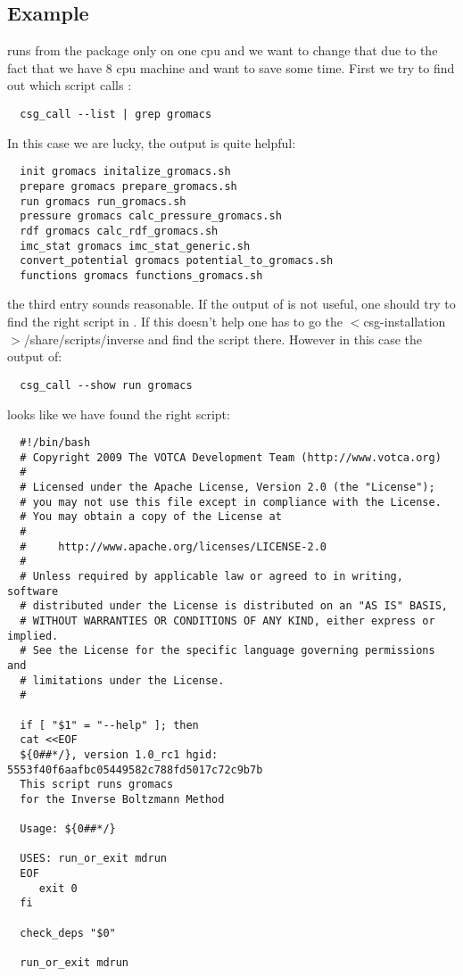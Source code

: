 \subsection*{Example}
 runs  from the \gromacs package only on one cpu and we want to change that due to the fact that we have 8 cpu machine and want to save some time.
First we try to find out which script calls :
\begin{verbatim}
  csg_call --list | grep gromacs
\end{verbatim}
In this case we are lucky, the output is quite helpful:
\begin{verbatim}
  init gromacs initalize_gromacs.sh
  prepare gromacs prepare_gromacs.sh
  run gromacs run_gromacs.sh
  pressure gromacs calc_pressure_gromacs.sh
  rdf gromacs calc_rdf_gromacs.sh
  imc_stat gromacs imc_stat_generic.sh
  convert_potential gromacs potential_to_gromacs.sh
  functions gromacs functions_gromacs.sh
\end{verbatim}
the third entry sounds reasonable. If the output of  is not useful, one should try to find the right script in . If this doesn't help one has to go the $<$csg-installation$>$/share/scripts/inverse and find the script there. However in this case the output of:
\begin{verbatim}
  csg_call --show run gromacs
\end{verbatim}
looks like we have found the right script:
\begin{verbatim}
  #!/bin/bash
  # Copyright 2009 The VOTCA Development Team (http://www.votca.org)
  #
  # Licensed under the Apache License, Version 2.0 (the "License");
  # you may not use this file except in compliance with the License.
  # You may obtain a copy of the License at
  #
  #     http://www.apache.org/licenses/LICENSE-2.0
  #
  # Unless required by applicable law or agreed to in writing, software
  # distributed under the License is distributed on an "AS IS" BASIS,
  # WITHOUT WARRANTIES OR CONDITIONS OF ANY KIND, either express or implied.
  # See the License for the specific language governing permissions and
  # limitations under the License.
  #

  if [ "$1" = "--help" ]; then
  cat <<EOF
  ${0##*/}, version 1.0_rc1 hgid: 5553f40f6aafbc05449582c788fd5017c72c9b7b
  This script runs gromacs
  for the Inverse Boltzmann Method

  Usage: ${0##*/}

  USES: run_or_exit mdrun
  EOF
     exit 0
  fi

  check_deps "$0"

  run_or_exit mdrun
\end{verbatim}
